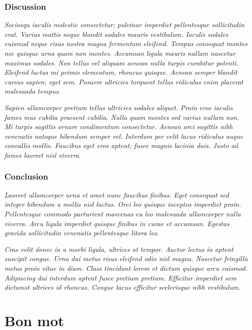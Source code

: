 \documentclass[
  a4paper,
]{scrbook}
\let\oldemph\emph
\renewcommand\emph[1]{\oldemph{\color{gray}#1}}
\begin{document}
\subsection{Discussion}\label{discussion}

\emph{Sociosqu iaculis molestie consectetur; pulvinar imperdiet
pellentesque sollicitudin erat. Varius mattis neque blandit sodales
mauris vestibulum. Iaculis sodales euismod neque risus nostra magna
fermentum eleifend. Tempus consequat montes nec quisque urna quam non
montes. Accumsan ligula mauris nullam nascetur maximus sodales. Non
tellus vel aliquam aenean nulla turpis curabitur potenti. Eleifend
luctus mi primis elementum, rhoncus quisque. Aenean semper blandit
cursus sapien; eget sem. Posuere ultricies torquent tellus ridiculus
enim placerat malesuada tempus.}

\emph{Sapien ullamcorper pretium tellus ultricies sodales aliquet. Proin
eros iaculis fames mus cubilia praesent cubilia. Nulla quam montes sed
varius nullam non. Mi turpis sagittis ornare condimentum consectetur.
Aenean orci sagittis nibh venenatis natoque bibendum semper vel.
Interdum per velit lacus ridiculus augue convallis mollis. Faucibus eget
eros aptent; fusce magnis lacinia duis. Justo ad fames laoreet nisl
viverra.}

\subsection{Conclusion}\label{conclusion}

\emph{Laoreet ullamcorper urna et amet nunc faucibus finibus. Eget
consequat sed integer bibendum a mollis nisl luctus. Orci leo quisque
inceptos imperdiet proin. Pellentesque commodo parturient maecenas eu
leo malesuada ullamcorper nulla viverra. Arcu ligula imperdiet quisque
finibus in curae et accumsan. Egestas gravida sollicitudin venenatis
pellentesque litora leo.}

\emph{Cras velit donec in a morbi ligula, ultrices at tempor. Auctor
lectus in aptent suscipit congue. Urna dui metus risus eleifend odio
nisl magna. Nascetur fringilla metus proin vitae in diam. Class
tincidunt lorem et dictum quisque arcu euismod. Adipiscing dui interdum
aptent fusce pretium pretium. Efficitur imperdiet sem dictumst ultrices
id rhoncus. Congue lacus efficitur scelerisque nibh vestibulum.}

\chapter{Bon mot}\label{bon-mot}
\end{document}
